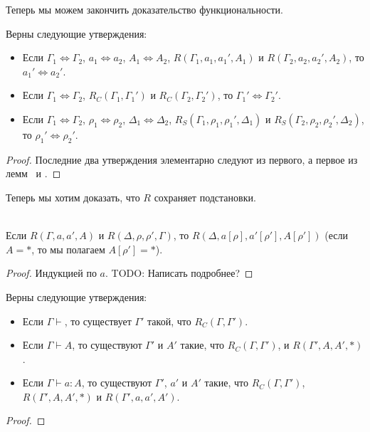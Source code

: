 \documentclass{amsart}
\theoremstyle{definition}
\theoremstyle{remark}
\newcommand{\deq}{\Leftrightarrow}
\numberwithin{figure}{section}
\begin{document}
Теперь мы можем закончить доказательство функциональности.
\begin{prop}
Верны следующие утверждения:
\begin{itemize}
\item Если $\Gamma_1 \deq \Gamma_2$, $a_1 \deq a_2$, $A_1 \deq A_2$, $R(\Gamma_1, a_1, a_1', A_1)$ и $R(\Gamma_2, a_2, a_2', A_2)$, то $a_1' \deq a_2'$.
\item Если $\Gamma_1 \deq \Gamma_2$, $R_C(\Gamma_1, \Gamma_1')$ и $R_C(\Gamma_2, \Gamma_2')$, то $\Gamma_1' \deq \Gamma_2'$.
\item Если $\Gamma_1 \deq \Gamma_2$, $\rho_1 \deq \rho_2$, $\Delta_1 \deq \Delta_2$, $R_S(\Gamma_1, \rho_1, \rho_1', \Delta_1)$ и $R_S(\Gamma_2, \rho_2, \rho_2', \Delta_2)$, то $\rho_1' \deq \rho_2'$.
\end{itemize}
\end{prop}
\begin{proof}
Последние два утверждения элементарно следуют из первого, а первое из лемм~ и .
\end{proof}

Теперь мы хотим доказать, что $R$ сохраняет подстановки.
\begin{lem} \ \\
Если $R(\Gamma, a, a', A)$ и $R(\Delta, \rho, \rho', \Gamma)$, то $R(\Delta, a[\rho], a'[\rho'], A[\rho'])$ (если $A = *$, то мы полагаем $A[\rho'] = *$).
\end{lem}
\begin{proof}
Индукцией по $a$. TODO: Написать подробнее?
\end{proof}

\begin{comment}

\begin{lem}
Если $a_1 \deq a_2$, $R(\Gamma, a_1, a_1', A)$ и $R(\Gamma, a_2, a_2', A)$, то $a_1' \deq a_2'$.
\end{lem}
\begin{proof}
\end{proof}
\end{comment}

\begin{prop}
Верны следующие утверждения:
\begin{itemize}
\item Если $\Gamma \vdash$, то существует $\Gamma'$ такой, что $R_C(\Gamma, \Gamma')$.
\item Если $\Gamma \vdash A$, то существуют $\Gamma'$ и $A'$ такие, что $R_C(\Gamma, \Gamma')$, и $R(\Gamma', A, A', *)$.
\item Если $\Gamma \vdash a : A$, то существуют $\Gamma'$, $a'$ и $A'$ такие, что $R_C(\Gamma, \Gamma')$, $R(\Gamma', A, A', *)$ и $R(\Gamma', a, a', A')$.
\end{itemize}
\end{prop}
\begin{proof}
\end{proof}
\end{document}
